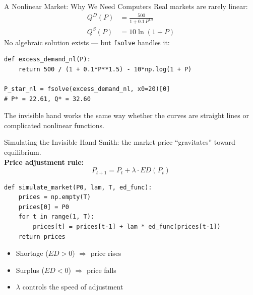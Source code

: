 \documentclass[aspectratio=169, 10pt]{beamer}
\begin{document}
\begin{frame}[fragile]{A Nonlinear Market: Why We Need Computers}
Real markets are rarely linear:
\vspace{0.3em}
\begin{align*}
  Q^D(P) &= \frac{500}{1 + 0.1\,P^{1.5}} \\[6pt]
  Q^S(P) &= 10 \ln(1 + P)
\end{align*}
\vspace{0.3em}
No algebraic solution exists --- but \texttt{fsolve} handles it:
\begin{lstlisting}
def excess_demand_nl(P):
    return 500 / (1 + 0.1*P**1.5) - 10*np.log(1 + P)

P_star_nl = fsolve(excess_demand_nl, x0=20)[0]
# P* = 22.61, Q* = 32.60
\end{lstlisting}
\vspace{0.3em}
The invisible hand works the same way whether the curves are straight lines
or complicated nonlinear functions.
\end{frame}

\begin{frame}[fragile]{Simulating the Invisible Hand}
Smith: the market price ``gravitates'' toward equilibrium.\\[6pt]
\textbf{Price adjustment rule:}
\[
  P_{t+1} = P_t + \lambda \cdot ED(P_t)
\]
\begin{lstlisting}
def simulate_market(P0, lam, T, ed_func):
    prices = np.empty(T)
    prices[0] = P0
    for t in range(1, T):
        prices[t] = prices[t-1] + lam * ed_func(prices[t-1])
    return prices
\end{lstlisting}
\vspace{0.3em}
\begin{itemize}
  \item Shortage ($ED > 0$) $\Rightarrow$ price rises
  \item Surplus ($ED < 0$) $\Rightarrow$ price falls
  \item $\lambda$ controls the speed of adjustment
\end{itemize}
\end{frame}
\end{document}

